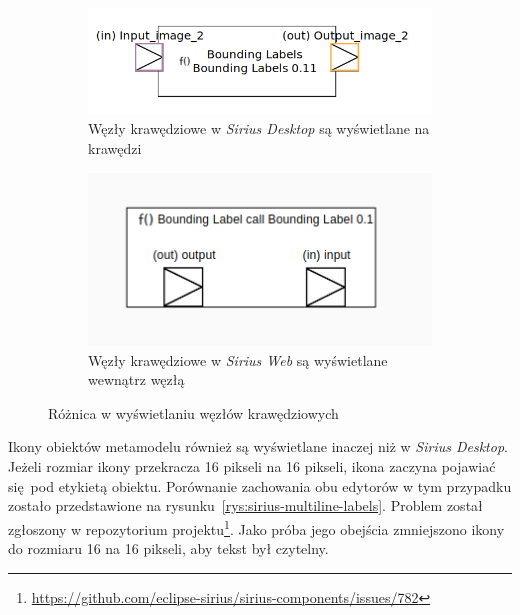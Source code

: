 \begin{figure}
	\centering
	\begin{subfigure}{.49\textwidth}
		\centering
		\includegraphics[width=.99\linewidth]{./images/border-node-sirius-desktop.png}
		\caption{Węzły krawędziowe w \emph{Sirius Desktop} są wyświetlane na
      krawędzi}
	\end{subfigure}
	\begin{subfigure}{.49\textwidth}
		\centering
		\includegraphics[width=.99\linewidth]{./images/border-node-sirius-web.png}
		\caption{Węzły krawędziowe w \emph{Sirius Web} są wyświetlane wewnątrz
      węzłą}\label{rys:border-node-sirius-web}
	\end{subfigure}

    \caption{Różnica w wyświetlaniu węzłów
      krawędziowych}\label{rys:border-node-difference}
\end{figure}

Ikony obiektów metamodelu również są wyświetlane inaczej niż w \emph{Sirius
	Desktop}. Jeżeli rozmiar ikony przekracza 16 pikseli na 16 pikseli,
ikona
zaczyna pojawiać się pod etykietą obiektu. Porównanie zachowania obu edytorów w
tym przypadku zostało przedstawione na
rysunku~\ref{rys:sirius-multiline-labels}. Problem został zgłoszony w
repozytorium projektu\footnote{
	\url{https://github.com/eclipse-sirius/sirius-components/issues/782}
}. Jako próba jego obejścia zmniejszono ikony do rozmiaru 16 na 16 pikseli, aby
tekst był czytelny.

